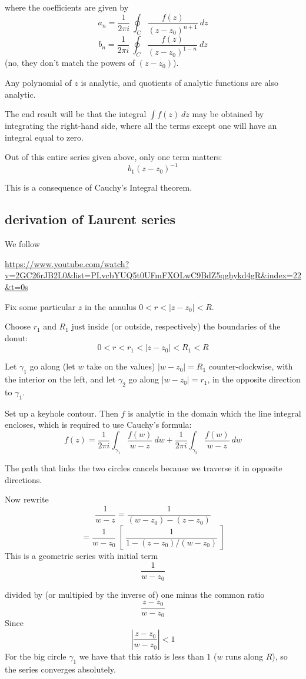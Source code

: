\documentclass[11pt, oneside]{article}
\begin{document}
where the coefficients are given by
\[ a_n = \frac{1}{2 \pi i} \ \oint_C \frac{f(z)}{(z - z_0)^{n+1}} \ dz \]
\[ b_n = \frac{1}{2 \pi i} \ \oint_C \frac{f(z)}{(z - z_0)^{1-n}} \ dz \]
(no, they don't match the powers of $(z - z_0)$).

Any polynomial of $z$ is analytic, and quotients of analytic functions are also analytic.  

The end result will be that the integral $\int f(z) \ dz$ may be obtained by integrating the right-hand side, where all the terms except one will have an integral equal to zero.

Out of this entire series given above, only one term matters:
\[ b_1(z-z_0)^{-1}  \]

This is a consequence of Cauchy's Integral theorem.

\subsection*{derivation of Laurent series}
We follow

\url{https://www.youtube.com/watch?v=2GC26rJB2L0&list=PLvcbYUQ5t0UFmFXOLwC9BdZ5qghykd4gR&index=22&t=0s}

Fix some particular $z$ in the annulus $0 < r < |z-z_0| < R$.

Choose $r_1$ and $R_1$ just inside (or outside, respectively) the boundaries of the donut:
\[ 0 < r < r_1 < |z-z_0| < R_1 < R \]

Let $\gamma_1$ go along (let $w$ take on the values) $|w - z_0| = R_1$ counter-clockwise, with the interior on the left, and let $\gamma_2$ go along $|w - z_0| = r_1$, in the opposite direction to $\gamma_1$.  

Set up a keyhole contour.  Then $f$ is analytic in the domain which the line integral encloses, which is required to use Cauchy's formula:
\[ f(z) = \frac{1}{2 \pi i} \int_{\gamma_1} \frac{f(w)}{w-z} \ dw + \frac{1}{2 \pi i} \int_{\gamma_2} \frac{f(w)}{w-z} \ dw \]

The path that links the two circles cancels because we traverse it in opposite directions.

Now rewrite 
\[ \frac{1}{w - z} = \frac{1}{(w - z_0) - (z - z_0)} \]
\[ = \frac{1}{w - z_0} \ [ \ \frac{1}{1 - (z-z_0)/(w-z_0)} \ ] \]
This is a geometric series with initial term
\[ \frac{1}{w - z_0} \]

divided by (or multipied by the inverse of) one minus the common ratio
\[ \frac{z-z_0}{w - z_0} \]
Since 
\[ | \frac{z - z_0}{w - z_0} | < 1 \]
For the big circle $\gamma_1$ we have that this ratio is less than $1$ ($w$ runs along $R$), so the series converges absolutely.
\end{document}

